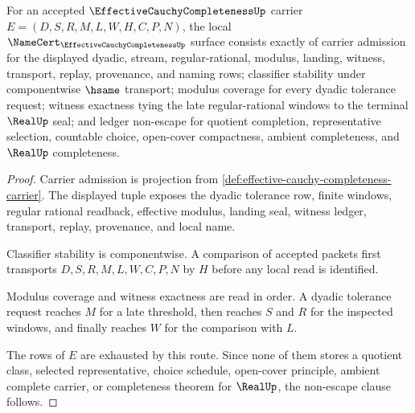 \begin{theorem}
\label{thm:effective-cauchy-completeness-namecert-obligations}
For an accepted $\EffectiveCauchyCompletenessUp$ carrier $E=(D,S,R,M,L,W,H,C,P,N)$, the local $\NameCert_{\EffectiveCauchyCompletenessUp}$ surface consists exactly of carrier admission for the displayed dyadic, stream, regular-rational, modulus, landing, witness, transport, replay, provenance, and naming rows; classifier stability under componentwise $\hsame$ transport; modulus coverage for every dyadic tolerance request; witness exactness tying the late regular-rational windows to the terminal $\RealUp$ seal; and ledger non-escape for quotient completion, representative selection, countable choice, open-cover compactness, ambient completeness, and $\RealUp$ completeness.
\end{theorem}
\begin{proof}
Carrier admission is projection from \autoref{def:effective-cauchy-completeness-carrier}. The displayed tuple exposes the dyadic tolerance row, finite windows, regular rational readback, effective modulus, landing seal, witness ledger, transport, replay, provenance, and local name.

Classifier stability is componentwise. A comparison of accepted packets first transports $D,S,R,M,L,W,C,P,N$ by $H$ before any local read is identified.

Modulus coverage and witness exactness are read in order. A dyadic tolerance request reaches $M$ for a late threshold, then reaches $S$ and $R$ for the inspected windows, and finally reaches $W$ for the comparison with $L$.

The rows of $E$ are exhausted by this route. Since none of them stores a quotient class, selected representative, choice schedule, open-cover principle, ambient complete carrier, or completeness theorem for $\RealUp$, the non-escape clause follows.
\end{proof}

